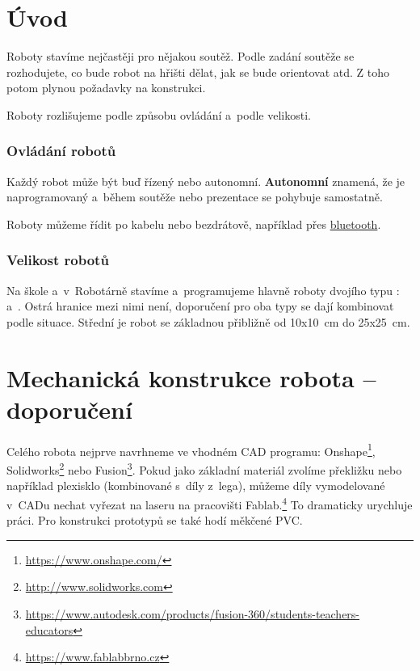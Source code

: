 

\section{Úvod}

\label{konstrukce}
 

Roboty stavíme nejčastěji pro nějakou soutěž. 
Podle zadání soutěže se rozhodujete, co bude robot na hřišti dělat, jak se bude orientovat atd.
Z toho potom plynou požadavky na konstrukci. 

Roboty rozlišujeme podle způsobu ovládání a~podle velikosti. 

\subsubsection*{Ovládání robotů} 

Každý robot může být buď řízený nebo autonomní.
{\bf Autonomní }znamená, že je naprogramovaný a~během soutěže nebo prezentace se pohybuje samostatně.  

Roboty můžeme řídit po kabelu nebo bezdrátově, například přes  \hyperlink{bluetooth}{bluetooth}.   


\subsubsection*{Velikost robotů} 

Na škole a~v~Robotárně stavíme a~programujeme hlavně roboty dvojího typu : a~.   
Ostrá hranice mezi nimi není, doporučení pro oba typy se dají kombinovat podle situace.  
Střední je robot se základnou přibližně od 10x10~cm do 25x25~cm.

\section{Mechanická konstrukce robota -- doporučení}

Celého robota nejprve navrhneme ve vhodném  CAD programu: Onshape\footnote{\url{https://www.onshape.com/}}, 
Solidworks\footnote{\url{http://www.solidworks.com}} nebo Fusion\footnote{\url{ https://www.autodesk.com/products/fusion-360/students-teachers-educators}}.
 
Pokud jako základní materiál zvolíme překližku nebo například plexisklo (kombinované s~díly z~lega),
můžeme díly vymodelované v~CADu nechat vyřezat na laseru na pracovišti Fablab.\footnote{\url{https://www.fablabbrno.cz}} 
To dramaticky urychluje práci.    
Pro konstrukci prototypů se také hodí měkčené PVC.  

